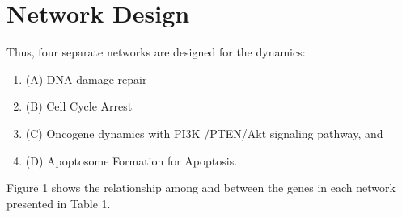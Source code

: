 
\section{Network Design}

Thus, four separate networks are designed for the dynamics:
\begin{enumerate}
\item (A) DNA damage repair 
\item (B) Cell Cycle Arrest  
\item (C) Oncogene dynamics  with PI3K /PTEN/Akt signaling pathway,  and 
\item (D) Apoptosome Formation for Apoptosis. 
\end{enumerate}

Figure 1 shows the relationship among and between the genes in each network presented in Table 1.

